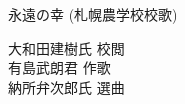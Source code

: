 ﻿\documentclass[10pt,a5j]{tarticle} %
\begin{document}
\thispagestyle{empty} %
\newcommand{\linespace}{1.0em} %
\newcommand{\blocksize}{0.33\hsize} %

\begin{minipage}[c]{0.7\hsize}
	\begin{center}
		{\LARGE
			永遠の幸
		}
		{\small 
			(札幌農学校校歌)
		}\\
	\end{center}
\end{minipage}
\begin{minipage}[c]{0.3\hsize}
	\begin{flushright}%
		大和田建樹氏 校閲\\ 
		有島武朗君 作歌\\ 
		納所弁次郎氏 選曲
	\end{flushright}
\end{minipage}
\end{document}
